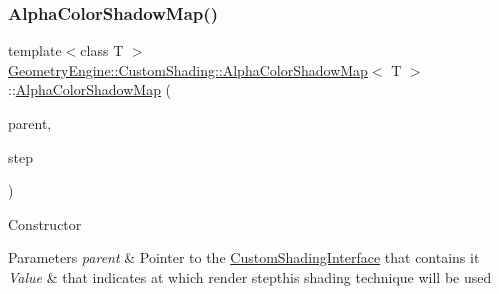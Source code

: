 \subsubsection{\texorpdfstring{AlphaColorShadowMap()}{AlphaColorShadowMap()}\hspace{0.1cm}{\footnotesize\ttfamily [1/2]}}
{\footnotesize\ttfamily template$<$class T $>$ \\
\mbox{\hyperlink{class_geometry_engine_1_1_custom_shading_1_1_alpha_color_shadow_map}{Geometry\+Engine\+::\+Custom\+Shading\+::\+Alpha\+Color\+Shadow\+Map}}$<$ T $>$\+::\mbox{\hyperlink{class_geometry_engine_1_1_custom_shading_1_1_alpha_color_shadow_map}{Alpha\+Color\+Shadow\+Map}} (\begin{DoxyParamCaption}\item[{\mbox{\hyperlink{class_geometry_engine_1_1_custom_shading_1_1_custom_shading_interface}{Custom\+Shading\+Interface}} $\ast$}]{parent,  }\item[{\mbox{\hyperlink{namespace_geometry_engine_1_1_custom_shading_a2dc236a5b567da5099069ce2b2be5609}{Custom\+Shading\+Steps}}}]{step }\end{DoxyParamCaption})\hspace{0.3cm}{\ttfamily [inline]}}

Constructor 
\begin{DoxyParams}{Parameters}
{\em parent} & Pointer to the \mbox{\hyperlink{class_geometry_engine_1_1_custom_shading_1_1_custom_shading_interface}{Custom\+Shading\+Interface}} that contains it \\
\hline
{\em Value} & that indicates at which render stepthis shading technique will be used \\
\hline
\end{DoxyParams}
\mbox{\label{class_geometry_engine_1_1_custom_shading_1_1_alpha_color_shadow_map_af642d840c7cb815b5f33aca8b25a82c1}} 
